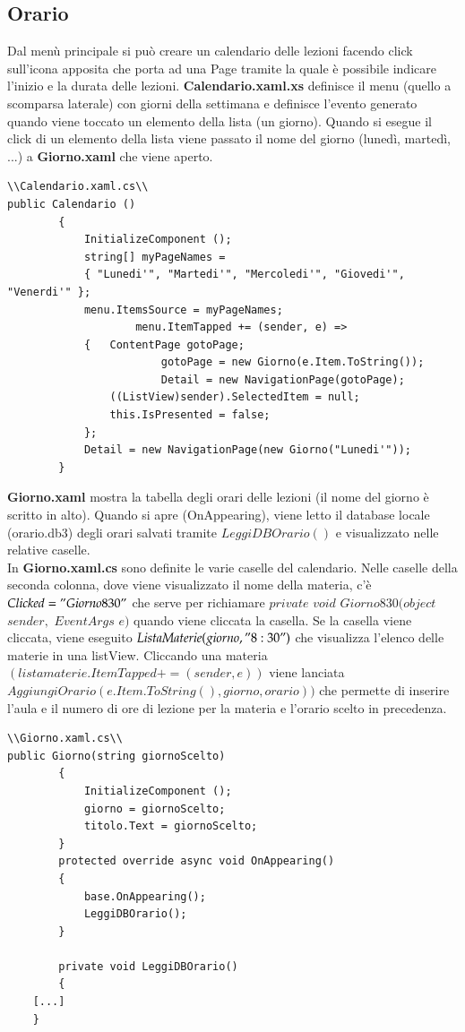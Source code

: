 \documentclass[a4paper, 50pt, twoside]{article}
\begin{document}
\subsection{Orario}
Dal menù principale si può creare un calendario delle lezioni facendo click sull'icona apposita che porta ad una Page tramite la quale è possibile indicare l'inizio e la durata delle lezioni.
\textbf{Calendario.xaml.xs} definisce il menu (quello a scomparsa laterale) con giorni della settimana e definisce l'evento generato quando viene toccato un elemento della lista (un giorno).
Quando si esegue il click di un elemento della lista viene passato il nome del giorno (lunedì, martedì, ...) a \textbf{Giorno.xaml} che viene aperto.
\begin{lstlisting}
\\Calendario.xaml.cs\\
public Calendario ()
		{
			InitializeComponent ();
			string[] myPageNames = 
			{ "Lunedi'", "Martedi'", "Mercoledi'", "Giovedi'", "Venerdi'" };
			menu.ItemsSource = myPageNames;
            		menu.ItemTapped += (sender, e) =>
			{	ContentPage gotoPage;
               			gotoPage = new Giorno(e.Item.ToString());
                		Detail = new NavigationPage(gotoPage);
				((ListView)sender).SelectedItem = null; 
				this.IsPresented = false;
			};
			Detail = new NavigationPage(new Giorno("Lunedi'"));
		}
\end{lstlisting}
 \textbf{Giorno.xaml} mostra la tabella degli orari delle lezioni (il nome del giorno è scritto in alto). Quando si apre (OnAppearing), viene letto il database locale (orario.db3) degli orari salvati tramite $LeggiDBOrario()$ e visualizzato nelle relative caselle. 
\\
In \textbf{Giorno.xaml.cs} sono definite le varie caselle del calendario. Nelle caselle della seconda colonna, dove viene visualizzato il nome della materia, c'è $Clicked="Giorno830"$ che serve per richiamare $private$ $void$ $Giorno830(object$ $sender,$ $EventArgs$ $e)$ quando viene cliccata la casella. Se la casella viene cliccata, viene eseguito $ListaMaterie(giorno,"8:30")$ che visualizza l'elenco delle materie in una listView.
Cliccando una materia $(listamaterie.ItemTapped+=(sender, e))$ viene lanciata $AggiungiOrario(e.Item.ToString(), giorno, orario))$ che permette di inserire l'aula e il numero di ore di lezione per la materia e l'orario scelto in precedenza.
\begin{lstlisting}
\\Giorno.xaml.cs\\
public Giorno(string giornoScelto)
		{
            InitializeComponent ();
            giorno = giornoScelto;
            titolo.Text = giornoScelto;
		}
        protected override async void OnAppearing()
        {
            base.OnAppearing();
            LeggiDBOrario();
        }

        private void LeggiDBOrario()
        {
	[...]
	}
\end{lstlisting}
\end{document}
